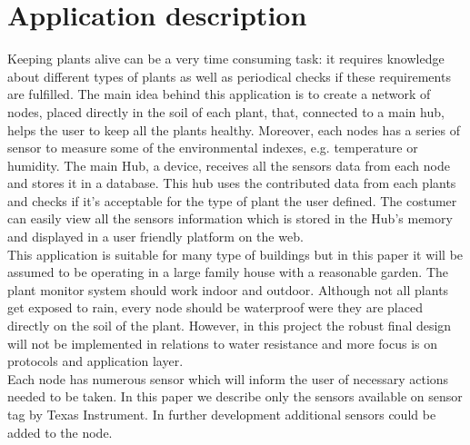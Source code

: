 \documentclass[conference]{IEEEtran}
\begin{document}
\section{Application description}
Keeping plants alive can be a very time consuming task: it requires knowledge about different types of plants as well as periodical checks if these requirements are fulfilled. 
The main idea behind this application is to create a network of nodes, placed directly in the soil of each plant, that, connected to a main hub, helps the user to keep all the plants healthy. Moreover, each nodes has a series of sensor to measure some of the environmental indexes, e.g. temperature or humidity. The main Hub, a device, receives all the sensors data from each node and stores it in a database. This hub uses the contributed data from each plants and checks if it's acceptable for the type of plant the user defined. The costumer can easily view all the sensors information which is stored in the Hub's memory and displayed in a user friendly platform on the web.	\\
This application is suitable for many type of buildings but in this paper it will be assumed to be operating in a large family house with a reasonable garden. The plant monitor system should work indoor and outdoor. Although not all plants get exposed to rain, every node should be waterproof were they are placed directly on the soil of the plant. However, in this project the robust final design will not be implemented in relations to water resistance and more focus is on protocols and application layer.\\
Each node has numerous sensor which will inform the user of necessary actions needed to be taken. In this paper we describe only the sensors available on sensor tag by Texas Instrument. In further development additional sensors could be added to the node.
 \\
 
\end{document}
